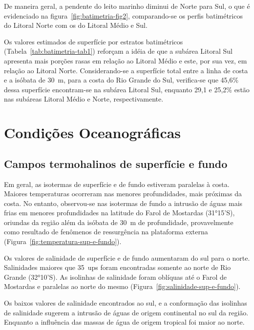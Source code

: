 \documentclass[a4paper,11pt,twoside,showtrims,onecolumn,openright,final]{memoir}
\begin{document}
De maneira geral, a pendente do leito marinho diminui de Norte para Sul, o que é evidenciado na figura~\ref{fig:batimetria-fig2},
comparando-se os perfis batimétricos do Litoral Norte com os do Litoral Médio e Sul.

Os valores estimados de superfície por estratos batimétricos (Tabela~\ref{tab:batimetria-tab1}) 
reforçam a idéia de que a subárea Litoral Sul apresenta mais porções rasas 
em relação ao Litoral Médio e este, por sua vez, em relação ao Litoral Norte. 
Considerando-se a superfície total entre a linha de costa e a isóbata de 30~m, 
para a costa do Rio Grande do Sul, verifica-se que 45,6\% dessa superfície 
encontram-se na subárea Litoral Sul, enquanto 29,1 e 25,2\% estão nas subáreas 
Litoral Médio e Norte, respectivamente.

\section*{Condições Oceanográficas}


\subsection*{Campos termohalinos de superfície e fundo}

Em geral, as isotermas de superfície e de fundo estiveram paralelas à costa.
Maiores temperaturas ocorreram nas menores profundidades, mais próximas da costa.
No entanto, observou-se nas isotermas de fundo a intrusão de águas mais frias em menores profundidades
na latitude do Farol de Mostardas (31°15'S), oriundas da região além da isóbata 
de 30~m de profundidade, provavelmente como resultado de fenômenos de ressurgência
na plataforma externa (Figura~\ref{fig:temperatura-sup-e-fundo}).

Os valores de salinidade de superfície e de fundo aumentaram
do sul para o norte. Salinidades maiores que 35~ups foram encontradas 
somente ao norte de Rio Grande (32°10'S).
As isolinhas de salinidade foram oblíquas até
o Farol de Mostardas e paralelas ao norte do mesmo (Figura~\ref{fig:salinidade-sup-e-fundo}). 

Os baixos valores de salinidade encontrados ao sul, e a conformação
das isolinhas de salinidade sugerem
a intrusão de águas de origem continental no sul da região. Enquanto 
a influência das massas de água de origem tropical foi maior ao norte.

%
\end{document}
